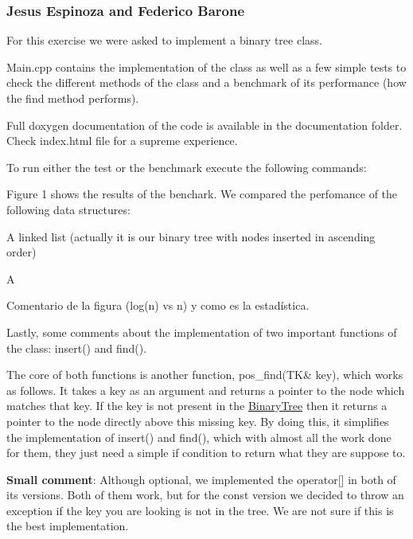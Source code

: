 \subsubsection*{Jesus Espinoza and Federico Barone}

\DoxyHorRuler


For this exercise we were asked to implement a binary tree class.

{\ttfamily Main.\+cpp} contains the implementation of the class as well as a few simple tests to check the different methods of the class and a benchmark of its performance (how the find method performs).

Full {\ttfamily doxygen} documentation of the code is available in the documentation folder. Check {\ttfamily index.\+html} file for a supreme experience.

To run either the test or the benchmark execute the following commands\+:

Figure 1 shows the results of the benchark. We compared the perfomance of the following data structures\+:


\begin{DoxyItemize}
\item A linked list (actually it is our binary tree with nodes inserted in ascending order)
\item A
\item 
\end{DoxyItemize}



Comentario de la figura (log(n) vs n) y como es la estadística.

Lastly, some comments about the implementation of two important functions of the class\+: {\ttfamily insert()} and {\ttfamily find()}.

The core of both functions is another function, {\ttfamily pos\+\_\+find(\+T\+K\& key)}, which works as follows. It takes a key as an argument and returns a pointer to the node which matches that key. If the key is not present in the {\ttfamily \mbox{\hyperlink{classBinaryTree}{Binary\+Tree}}} then it returns a pointer to the node directly above this missing key. By doing this, it simplifies the implementation of insert() and find(), which with almost all the work done for them, they just need a simple if condition to return what they are suppose to.

\DoxyHorRuler


{\bfseries{Small comment}}\+: Although optional, we implemented the operator\mbox{[}\mbox{]} in both of its versions. Both of them work, but for the const version we decided to throw an exception if the key you are looking is not in the tree. We are not sure if this is the best implementation. 